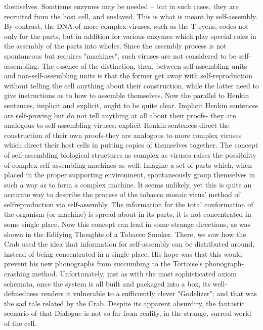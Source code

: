 {themselves. Somtiems enzymes may be needed – but in such cases, they are recruited from
the host cell, and enslaved. This is what is meant by self-assembly.
         By contrast, the DNA of more complex viruses, such as the T-evens, codes not only
for the parts, but in addition for various enzymes which play special roles in the assembly of
the parts into wholes. Since the assembly process is not spontaneous but requires "machines",
such viruses are not considered to be self-assembling. The essence of the distinction, then,
between self-assembling units and non-self-assembling units is that the former get away with
self-reproduction without telling the cell anything about their construction, while the latter
need to give instructions as to how to assemble themselves.
         Now the parallel to Henkin sentences, implicit and explicit, ought to be quite clear.
Implicit Henkin sentences are self-proving but do not tell anything at all about their proofs-
they are analogous to self-assembling viruses; explicit Henkin sentences direct the
construction of their own proofs-they are analogous to more complex viruses which direct
their host cells in putting copies of themselves together.
         The concept of self-assembling biological structures as complex as viruses raises the
possibility of complex self-assembling machines as well. Imagine a set of parts which, when
placed in the proper supporting environment, spontaneously group themselves in such a way
as to form a complex machine. It seems unlikely, yet this is quite an accurate way to describe
the process of the tobacco mosaic virus' method of selfreproduction via self-assembly. The
information for the total conformation of the organism (or machine) is spread about in its
parts; it is not concentrated in some single place.
         Now this concept can lead in some strange directions, as was shown in the Edifying
Thoughts of a Tobacco Smoker. There, we saw how the Crab used the idea that information
for self-assembly can be distributed around, instead of being concentrated in a single place.
His hope was that this would prevent his new phonographs from succumbing to the Tortoise's
phonograph-crashing method. Unfortunately, just as with the most sophisticated axiom
schemata, once the system is all built and packaged into a box, its well-definedness renders it
vulnerable to a sufficiently clever "Godelizer"; and that was the sad tale related by the Crab.
Despite its apparent absurdity, the fantastic scenario of that Dialogue is not so far from
reality, in the strange, surreal world of the cell.


}
